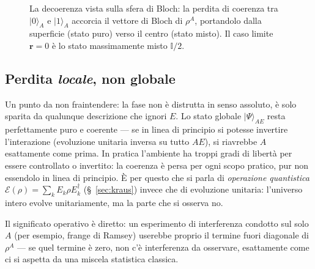 \documentclass[11pt,a4paper]{article}
\newcommand{\ket}[1]{\lvert #1 \rangle}
\begin{document}
\begin{figure}[htbp]
\centering
{}
\caption{La decoerenza vista sulla sfera di Bloch: la perdita di coerenza tra
$\ket0_A$ e $\ket1_A$ accorcia il vettore di Bloch di $\rho^A$, portandolo dalla
superficie (stato puro) verso il centro (stato misto). Il caso limite $\mathbf r=0$
è lo stato massimamente misto $\mathbb I/2$.}
\label{fig:bloch-shrink}
\end{figure}

\FloatBarrier
\subsection{Perdita \emph{locale}, non globale}

Un punto da non fraintendere: la fase non è distrutta in senso assoluto, è solo sparita
da qualunque descrizione che ignori $E$. Lo stato globale $\ket\Psi_{AE}$ resta
perfettamente puro e coerente --- se in linea di principio si potesse invertire
l'interazione (evoluzione unitaria inversa su tutto $AE$), si riavrebbe $A$
esattamente come prima. In pratica l'ambiente ha troppi gradi di libertà per essere
controllato o invertito: la coerenza è persa per ogni scopo pratico, pur non essendolo
in linea di principio. È per questo che si parla di \emph{operazione quantistica}
$\mathcal E(\rho)=\sum_k E_k\rho E_k^\dagger$ (\S~\ref{sec:kraus}) invece che di
evoluzione unitaria: l'universo intero evolve unitariamente, ma la parte che si
osserva no.

Il significato operativo è diretto: un esperimento di interferenza condotto sul solo
$A$ (per esempio, frange di Ramsey) userebbe proprio il termine fuori diagonale di
$\rho^A$ --- se quel termine è zero, non c'è interferenza da osservare, esattamente
come ci si aspetta da una miscela statistica classica.
\end{document}
